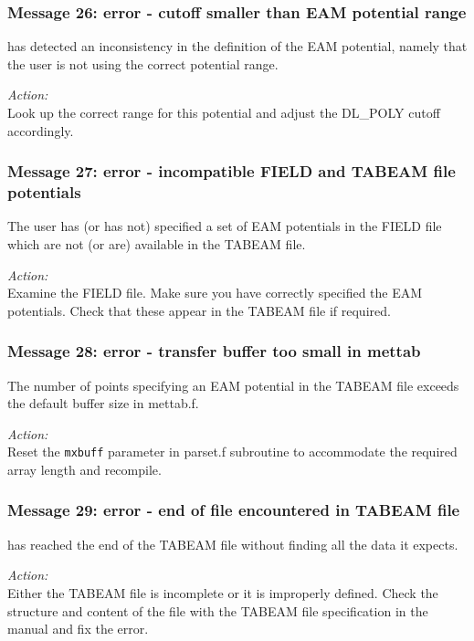 \subsubsection*{Message 26: error - cutoff smaller than EAM potential
range}

\D{} has detected an inconsistency in the definition of the EAM
potential, namely that the user is not using the correct potential
range.

\noindent
{\em Action:} \\ Look up the correct range for this potential and
adjust the DL\_POLY cutoff accordingly.

\subsubsection*{Message 27: error - incompatible FIELD and TABEAM file
potentials} 

The user has (or has not) specified a set of EAM potentials in the FIELD
file which are not (or are) available in the TABEAM file.

\noindent
{\em Action:} \\ Examine the FIELD file. Make sure you have correctly
specified the EAM potentials. Check that these appear in the TABEAM
file if required.

\subsubsection*{Message 28: error - transfer buffer too small in
mettab}

The number of points specifying an EAM potential in the TABEAM file
exceeds the default buffer size in {\sc mettab.f}. 

\noindent
{\em Action:} \\ Reset the {\tt mxbuff} parameter in {\sc parset.f}
subroutine to accommodate the required array length and recompile.

\subsubsection*{Message 29: error - end of file encountered in TABEAM
file}

\D{} has reached the end of the TABEAM file without finding all the data
it expects. 

\noindent
{\em Action:} \\ Either the TABEAM file is incomplete or it is
improperly defined. Check the structure and content of the file with
the TABEAM file specification in the manual and fix the error.

